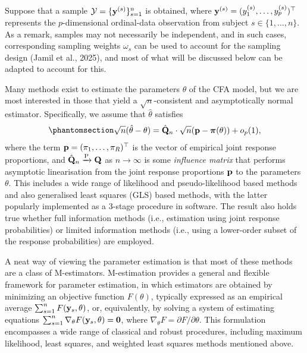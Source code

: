 \documentclass[
  letterpaper,
  DIV=11,
  numbers=noendperiod]{scrartcl}
\begin{document}
Suppose that a sample \(\mathcal Y = \{{\mathbf y}^{(s)}\}_{s=1}^n\) is
obtained, where \({\mathbf y}^{(s)} = (y_1^{(s)},\ldots,y_p^{(s)})^\top\)
represents the \(p\)-dimensional ordinal-data observation from subject
\(s\in\{1,\dots,n\}\). As a remark, samples may not necessarily be
independent, and in such cases, corresponding sampling weights
\(\omega_s\) can be used to account for the sampling design (Jamil et
al., 2025), and most of what will be discussed below can be adapted to
account for this.

Many methods exist to estimate the parameters \(\theta\) of the CFA
model, but we are most interested in those that yield a
\(\sqrt{n}\)-consistent and asymptotically normal estimator.
Specifically, we assume that \(\hat\theta\) satisfies
\begin{equation}\phantomsection\label{eq-theta-consistent}{
\begin{aligned}
\sqrt{n}(\hat\theta - \theta) = \hat\bQ_n \cdot \sqrt{n}(\bp - \bpi(\theta)) + o_p(1),
\end{aligned}
}\end{equation} where the term \({\mathbf p} = (\pi_1,\ldots,\pi_R)^\top\) is
the vector of empirical joint response proportions, and
\(\hat{{\mathbf Q}}_n \xrightarrow{\text P} {\mathbf Q}\) as \(n\to\infty\) is some
\emph{influence matrix} that performs asymptotic linearisation from the
joint response proportions \({\mathbf p}\) to the parameters \(\theta\). This
includes a wide range of likelihood and pseudo-likelihood based methods
and also generalised least squares (GLS) based methods, with the latter
popularly implemented as a 3-stage procedure in software. The result
also holds true whether full information methods (i.e., estimation using
joint response probabilities) or limited information methods (i.e.,
using a lower-order subset of the response probabilities) are employed.

A neat way of viewing the parameter estimation is that most of these
methods are a class of M-estimators. M-estimation provides a general and
flexible framework for parameter estimation, in which estimators are
obtained by minimizing an objective function \(F(\theta)\), typically
expressed as an empirical average \(\sum_{s=1}^n F({\mathbf y}_s, \theta)\), or,
equivalently, by solving a system of estimating equations
\(\sum_{s=1}^n \nabla_\theta F({\mathbf y}_s, \theta) = {\mathbf 0}\), where
\(\nabla_\theta F = \partial F / \partial \theta\). This formulation
encompasses a wide range of classical and robust procedures, including
maximum likelihood, least squares, and weighted least squares methods
mentioned above.
\end{document}
